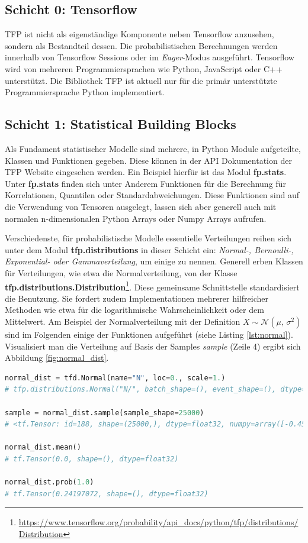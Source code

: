 \documentclass[12pt]{article}
\begin{document}
\subsection{Schicht 0: Tensorflow}
TFP ist nicht als eigenständige Komponente neben Tensorflow anzusehen, sondern als Bestandteil dessen. Die probabilistischen Berechnungen werden innerhalb von Tensorflow Sessions oder im \textit{Eager}-Modus ausgeführt. Tensorflow wird von mehreren Programmiersprachen wie Python, JavaScript oder C++ unterstützt. Die Bibliothek TFP ist aktuell nur für die primär unterstützte Programmiersprache Python implementiert.

\subsection{Schicht 1: Statistical Building Blocks}

Als Fundament statistischer Modelle sind mehrere, in Python Module aufgeteilte, Klassen und Funktionen gegeben. Diese können in der API Dokumentation der TFP Website eingesehen werden. Ein Beispiel hierfür ist das Modul \textbf{fp.stats}. Unter \textbf{fp.stats} finden sich unter Anderem Funktionen für die Berechnung für Korrelationen, Quantilen oder Standardabweichungen. Diese Funktionen sind auf die Verwendung von Tensoren ausgelegt, lassen sich aber generell auch mit normalen n-dimensionalen Python Arrays oder Numpy Arrays aufrufen.  

Verschiedenste, für probabilistische Modelle essentielle Verteilungen reihen sich unter dem Modul \textbf{tfp.distributions} in dieser Schicht ein: \textit{Normal-, Bernoulli-, Exponential- oder Gammaverteilung}, um einige zu nennen. Generell erben Klassen für Verteilungen, wie etwa die Normalverteilung, von der Klasse \textbf{tfp.distributions.Distribution}\footnote{\url{https://www.tensorflow.org/probability/api_docs/python/tfp/distributions/Distribution}}. Diese gemeinsame Schnittstelle standardisiert die Benutzung. Sie fordert zudem Implementationen mehrerer hilfreicher Methoden wie etwa für die logarithmische Wahrscheinlichkeit oder dem Mittelwert. Am Beispiel der Normalverteilung mit der Definition $X \sim \mathcal{N}(\mu,\,\sigma^{2})$ sind im Folgenden einige der Funktionen aufgeführt (siehe Listing \ref{lst:normal}). Visualisiert man die Verteilung auf Basis der Samples \textit{sample} (Zeile 4) ergibt sich Abbildung \ref{fig:normal_dist}.

\begin{lstlisting}[language=Python, caption={Verwendung der Klasse tfp.distributions.Normal}, label={lst:normal}]
normal_dist = tfd.Normal(name="N", loc=0., scale=1.)
# tfp.distributions.Normal("N/", batch_shape=(), event_shape=(), dtype=float32)

sample = normal_dist.sample(sample_shape=25000)
# <tf.Tensor: id=188, shape=(25000,), dtype=float32, numpy=array([-0.45733708, -0.19126031, -0.33290815, ..., -1.1285563 , -0.6958163 ,  0.552399  ], dtype=float32)>

normal_dist.mean() 
# tf.Tensor(0.0, shape=(), dtype=float32)

normal_dist.prob(1.0) 
# tf.Tensor(0.24197072, shape=(), dtype=float32)
\end{lstlisting}
\end{document}
